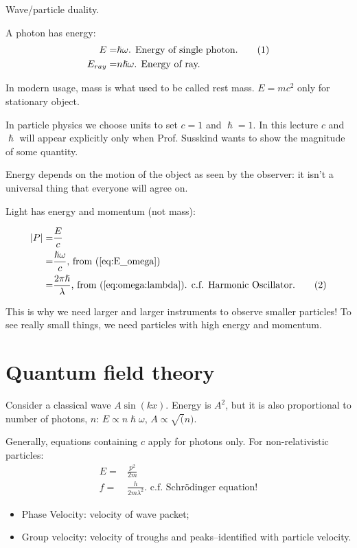 \documentclass[]{article}
\newcommand\numberthis{\addtocounter{equation}{1}\tag{\theequation}}
\begin{document}
Wave/particle duality.

A photon has energy:
\begin{align*}
E=&\hslash \omega \text{. Energy of single photon.} \numberthis\label{eq:E_omega}\\
E_{ray}=&n \hslash \omega \text{. Energy of ray.}
\end{align*}
 

In modern usage, mass is what used to be called rest mass. $E = m c^2$ only for stationary object.

In particle physics we choose units to set $c=1$ and $\hslash=1$. In this lecture $c$ and $\hslash$ will appear explicitly only when Prof. Susskind wants to show the magnitude of some quantity.

Energy depends on the motion of the object as seen by the observer: it isn't a universal thing that everyone will agree on.

Light has energy and momentum (not mass): 

\begin{align*}
\left|P\right|=&\frac{E}{c} \\
=&\frac{\hslash \omega}{c} \text{, from (\ref{eq:E_omega})}\\
=& \frac{2 \pi \hslash}{\lambda} \text{, from (\ref{eq:omega:lambda}). c.f. Harmonic Oscillator.}\numberthis\label{eq:P:lambda}
\end{align*}

This is why we need larger and larger instruments to observe smaller particles!
To see really small things, we need particles with high energy and momentum.


\section{Quantum field theory}

Consider a classical wave $A \sin(kx)$. Energy is $A^2$, but it is also proportional to number of photons, $n$: $E \propto n \hslash \omega$, $A \propto \sqrt(n)$.

Generally, equations containing $c$ apply for photons only. For non-relativistic particles:
\begin{align*}
E=&\frac{p^2}{2m}\\
f =& \frac{h}{2 m \lambda^2} \text{. c.f. Schr\"odinger equation!}
\end{align*}

\begin{itemize}
	\item Phase Velocity: velocity of wave packet;
	\item Group velocity: velocity of troughs and peaks--identified with particle velocity.
\end{itemize}
\end{document}

